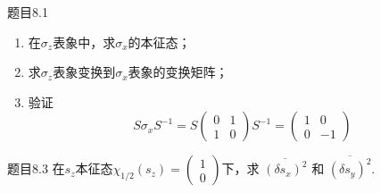 \begin{question}{题目8.1}
    \begin{enumerate}
        \item 在$\sigma_z$表象中，求$\sigma_x$的本征态；
        \item 求$\sigma_z$表象变换到$\sigma_x$表象的变换矩阵；
        \item 验证
              $$
                  S\sigma_xS^{-1} = S\begin{pmatrix} 0 & 1 \\ 1 & 0 \end{pmatrix}S^{-1}=\begin{pmatrix} 1 & 0 \\ 0 & -1 \end{pmatrix}
              $$
    \end{enumerate}
\end{question}
\begin{solution}

\end{solution}



\begin{question}{题目8.3}
    在$s_z$本征态$\chi_{1/2}(s_z)=\begin{pmatrix} 1 \\ 0 \end{pmatrix}$下，求 $\overline{(\delta{s_x})^2}$ 和 $\overline{(\delta{s_y})^2}$.
\end{question}
\begin{solution}

\end{solution}



